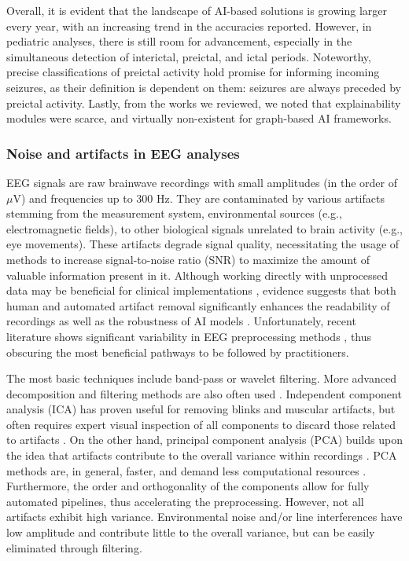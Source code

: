 \documentclass[a4paper,fleqn]{cas-sc}
\begin{document}
Overall, it is evident that the landscape of AI-based solutions is growing larger every year, with an increasing trend in the accuracies reported. However, in pediatric analyses, there is still room for advancement, especially in the simultaneous detection of interictal, preictal, and ictal periods. Noteworthy, precise classifications of preictal activity hold promise for informing incoming seizures, as their definition is dependent on them: seizures are always preceded by preictal activity. Lastly, from the works we reviewed, we noted that explainability modules were scarce, and virtually non-existent for graph-based AI frameworks.

\subsubsection*{Noise and artifacts in EEG analyses}

EEG signals are raw brainwave recordings with small amplitudes (in the order of $\mu$V) and frequencies up to 300 Hz. They are contaminated by various artifacts stemming from the measurement system, environmental sources (e.g., electromagnetic fields), to other biological signals unrelated to brain activity (e.g., eye movements). These artifacts degrade signal quality, necessitating the usage of methods to increase signal-to-noise ratio (SNR) to maximize the amount of valuable information present in it. Although working directly with unprocessed data may be beneficial for clinical implementations \cite{LiChenFFTCNN,Wang1DCNNPrediction,YaoBiLSTM}, evidence suggests that both human and automated artifact removal significantly enhances the readability of recordings \cite{JinArtifactSota, KunjiraPreprocessingEEG} as well as the robustness of AI models \cite{JinArtifactSota,KunjiraPreprocessingEEG,MazurekPreprocessing}. Unfortunately, recent literature shows significant variability in EEG preprocessing methods \cite{GeethaEEGDenoise,UpadhyayEEGDenoise,SatyenderEEGDenoise,MumtazEEGArtifactReview}, thus obscuring the most beneficial pathways to be followed by practitioners.

The most basic techniques include band-pass \cite{JiaEfficientGraphConv} or wavelet \cite{GaoWaveletCnnClassification} filtering. More advanced decomposition and filtering methods are also often used \cite{GiudiceCNNAdvancedPrepro}. Independent component analysis (ICA) has proven useful \cite{HyvarinenICA} for removing blinks and muscular artifacts, but often requires expert visual inspection of all components to discard those related to artifacts \cite{LiIcalabel}. On the other hand, principal component analysis (PCA) builds upon the idea that artifacts contribute to the overall variance within recordings \cite{ShlensPCA}. PCA methods are, in general, faster, and demand less computational resources \cite{MumtazEEGArtifactReview}. Furthermore, the order and orthogonality of the components allow for fully automated pipelines, thus accelerating the preprocessing. However, not all artifacts exhibit high variance. Environmental noise and/or line interferences have low amplitude and contribute little to the overall variance, but can be easily eliminated through filtering.
\end{document}
